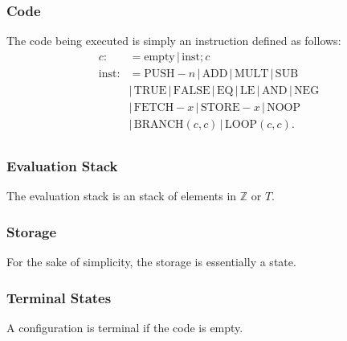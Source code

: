 \documentclass[a4paper, 12pt, twoside]{article}
\begin{document}
\subsubsection{Code}

The code being executed is simply an instruction defined as follows:
\begin{align*}
  c :&= \text{empty} \, | \, \text{inst};c \\
  \text{inst} :&= \text{PUSH}-n \, | \, \text{ADD} \, | \, \text{MULT} \, | \, \text{SUB} \\
  &| \, \text{TRUE} \, | \, \text{FALSE} \, | \, \text{EQ} \, | \, \text{LE} \, | \, \text{AND} \, | \, \text{NEG} \\
  &| \, \text{FETCH}-x \, | \, \text{STORE}-x \, | \, \text{NOOP} \\
  &| \, \text{BRANCH}(c, c) \, | \, \text{LOOP}(c, c). \\
\end{align*}

\subsubsection{Evaluation Stack}

The evaluation stack is an stack of elements in $\mathbb{Z}$ or $T$.

\subsubsection{Storage}

For the sake of simplicity, the storage is essentially a state.

\subsubsection{Terminal States}

A configuration is terminal if the code is empty.
\end{document}
